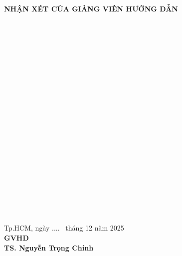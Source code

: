 \begin{titlepage}
\begin{center}
{\bfseries\fontsize{14pt}{16pt}\selectfont
NHẬN XÉT CỦA GIẢNG VIÊN HƯỚNG DẪN
}\\[1cm]
\end{center}

\newcommand{\dotline}{\noindent\makebox[\textwidth]{\dotfill}\\[0.3cm]}

\dotline
\dotline
\dotline
\dotline
\dotline
\dotline
\dotline
\dotline
\dotline
\dotline
\dotline
\dotline
\dotline
\dotline
\dotline
\dotline
\dotline
\dotline
\dotline
\dotline

\begin{flushright}
Tp.HCM, ngày .... \ tháng 12 năm 2025 \\[0.4cm]
\textbf{GVHD}\\[3cm]
\textbf{TS. Nguyễn Trọng Chính}
\end{flushright}

\end{titlepage}
